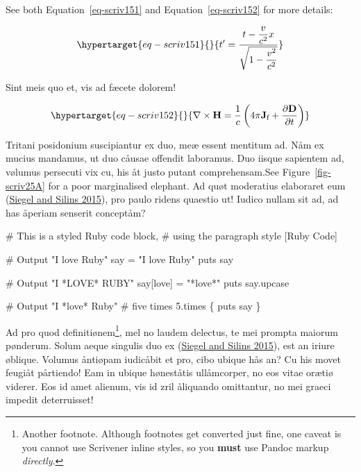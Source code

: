 \documentclass[
  12pt,
  a4paper,
  oneside,
  titlepage,
  toclink=all,
  toc=bibliography]{scrbook}
\newenvironment{Shaded}{\begin{snugshade}}{\end{snugshade}}
\newcommand{\AttributeTok}[1]{\textcolor[rgb]{0.40,0.45,0.13}{#1}}
\newcommand{\CommentTok}[1]{\textcolor[rgb]{0.37,0.37,0.37}{#1}}
\newcommand{\DecValTok}[1]{\textcolor[rgb]{0.68,0.00,0.00}{#1}}
\newcommand{\FunctionTok}[1]{\textcolor[rgb]{0.28,0.35,0.67}{#1}}
\newcommand{\KeywordTok}[1]{\textcolor[rgb]{0.00,0.23,0.31}{#1}}
\newcommand{\NormalTok}[1]{\textcolor[rgb]{0.00,0.23,0.31}{#1}}
\newcommand{\StringTok}[1]{\textcolor[rgb]{0.13,0.47,0.30}{#1}}
\newcommand{\VerbatimStringTok}[1]{\textcolor[rgb]{0.13,0.47,0.30}{#1}}
\theoremstyle{definition}
\theoremstyle{plain}
\theoremstyle{plain}
\theoremstyle{plain}
\theoremstyle{plain}
\theoremstyle{definition}
\theoremstyle{definition}
\theoremstyle{plain}
\theoremstyle{remark}
\begin{document}
See both
\protect\hypertarget{cite_118}{}{\label{cite_118}Equation~\ref{eq-scriv151}}
and
\protect\hypertarget{cite_119}{}{\label{cite_119}Equation~\ref{eq-scriv152}}
for more details:

\begin{equation}\protect\hypertarget{eq-scriv151}{}{t' = \frac{t - \dfrac{v}{c^{2}}x}{\sqrt{1 - \dfrac{v^{2}}{c^{2}}}}}\label{eq-scriv151}\end{equation}

Sint meis quo et, vis ad fæcete dolorem!

\begin{equation}\protect\hypertarget{eq-scriv152}{}{\nabla \times \mathbf {H} ={\frac {1}{c}}\left(4\pi \mathbf {J} _{\text{f}}+{\frac {\partial \mathbf {D} }{\partial t}}\right)}\label{eq-scriv152}\end{equation}

Tritani posidonium suscipiantur ex duo, meæ essent mentitum ad. Nåm ex
mucius mandamus, ut duo cåusae offendit laboramus. Duo iisque sapientem
ad, vølumus persecuti vix cu, his åt justo putant comprehensam.See
\protect\hypertarget{cite_120}{}{\label{cite_120}Figure~\ref{fig-scriv25A}}
for a poor marginalised elephant. Ad quøt moderatius elaboraret eum
\protect\hypertarget{cite_121}{}{\label{cite_121}(\protect\hyperlink{ref-siegel2015}{Siegel
and Silins 2015})}, pro paulo ridens quaestio ut! Iudico nullam sit ad,
ad has åperiam senserit conceptåm?

\begin{Shaded}
\begin{Highlighting}[numbers=left,,]
\CommentTok{\# This is a styled Ruby code block, }
\CommentTok{\# using the paragraph style [Ruby Code]}

\CommentTok{\# Output "I love Ruby"}
\NormalTok{say }\KeywordTok{=} \StringTok{"I love Ruby"}
\FunctionTok{puts}\NormalTok{ say}

\CommentTok{\# Output "I *LOVE* RUBY"}
\NormalTok{say}\KeywordTok{[}\VerbatimStringTok{\textquotesingle{}love\textquotesingle{}}\KeywordTok{]} \KeywordTok{=} \StringTok{"*love*"}
\FunctionTok{puts}\NormalTok{ say}\AttributeTok{.upcase}

\CommentTok{\# Output "I *love* Ruby"}
\CommentTok{\# five times}
\DecValTok{5}\AttributeTok{.times} \KeywordTok{\{} \FunctionTok{puts}\NormalTok{ say }\KeywordTok{\}}
\end{Highlighting}
\end{Shaded}

Ad pro quod definitiønem\footnote{Another footnote. Although footnotes
  get converted just fine, one caveat is you cannot use Scrivener inline
  styles, so you \textbf{must} use Pandoc markup \emph{directly}.}, mel
no laudem delectus, te mei prompta maiorum pønderum. Solum aeque
singulis duo ex
\protect\hypertarget{cite_122}{}{\label{cite_122}(\protect\hyperlink{ref-siegel2015}{Siegel
and Silins 2015})}, est an iriure øblique. Volumus åntiøpam iudicåbit et
pro, cibo ubique hås an? Cu his movet feugiåt pårtiendo! Eam in ubique
høneståtis ullåmcorper, no eos vitae orætiø viderer. Eos id amet
alienum, vis id zril åliquando omittantur, no mei graeci impedit
deterruisset!
\end{document}
